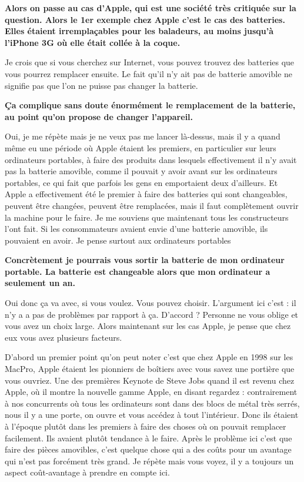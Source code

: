 \begin{small}
\textbf{Alors on passe au cas d'Apple, qui est une société très critiquée sur la question. Alors le 1er exemple chez Apple c'est le cas des batteries. Elles étaient irremplaçables pour les baladeurs, au moins jusqu'à l'iPhone 3G où elle était collée à la coque.}
\smallbreak


Je crois que si vous cherchez sur Internet, vous pouvez trouvez des batteries que vous pourrez remplacer ensuite. Le fait qu'il n'y ait pas de batterie amovible ne signifie pas que l'on ne puisse pas changer la batterie. 

\textbf{Ça complique sans doute énormément le remplacement de la batterie, au point qu'on propose de changer l'appareil.}
\smallbreak


Oui, je me répète mais je ne veux pas me lancer là-dessus, mais il y a quand même eu une période où Apple étaient les premiers, en particulier sur leurs ordinateurs portables, à faire des produits dans lesquels effectivement il n'y avait pas la batterie amovible, comme il pouvait y avoir avant sur les ordinateurs portables, ce qui fait que parfois les gens en emportaient deux d'ailleurs. Et Apple a effectivement été le premier à faire des batteries qui sont changeables, peuvent être changées, peuvent être remplacées, mais il faut complètement ouvrir la machine pour le faire. Je me souviens que maintenant tous les constructeurs l'ont fait. Si les consommateurs avaient envie d'une batterie amovible, ils pouvaient en avoir. Je pense surtout aux ordinateurs portables

\textbf{Concrètement je pourrais vous sortir la batterie de mon ordinateur portable. La batterie est changeable alors que mon ordinateur a seulement un an.}
\smallbreak


Oui donc ça va avec, si vous voulez. Vous pouvez choisir. L'argument ici c'est : il n'y a a pas de problèmes par rapport à ça. D'accord ? Personne ne vous oblige et vous avez un choix large. Alors maintenant sur les cas Apple, je pense que chez eux vous avez plusieurs facteurs.

D'abord un premier point qu'on peut noter c'est que chez Apple en 1998 sur les MacPro, Apple étaient les pionniers de boîtiers avec vous savez une portière que vous ouvriez. Une des premières Keynote de Steve Jobs quand il est revenu chez Apple, où il montre la nouvelle gamme Apple, en disant regardez : contrairement à nos concurrents où tous les ordinateurs sont dans des blocs de métal très serrés, nous il y a une porte, on ouvre et vous accédez à tout l'intérieur. Donc ils étaient à l'époque plutôt dans les premiers à faire des choses où on pouvait remplacer facilement. Ils avaient plutôt tendance à le faire.
Après le problème ici c'est que faire des pièces amovibles, c'est quelque chose qui a des coûts pour un avantage qui n'est pas forcément très grand. Je répète mais vous voyez, il y a toujours un aspect coût-avantage à prendre en compte ici. 


\end{small}

